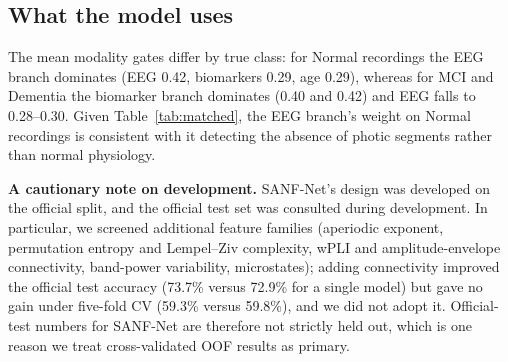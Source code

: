 \documentclass[conference]{IEEEtran}
\begin{document}
\begin{table}[t]
\centering
\caption{Age-matched AUC versus MCI (1:1, caliper 2 years) on out-of-fold predictions, with 95\%
bootstrap CI over matched pairs.}
\label{tab:matched}
\end{table}

\subsection{What the model uses}
The mean modality gates differ by true class: for Normal recordings the EEG branch dominates (EEG 0.42,
biomarkers 0.29, age 0.29), whereas for MCI and Dementia the biomarker branch dominates (0.40 and 0.42)
and EEG falls to 0.28--0.30. Given Table~\ref{tab:matched}, the EEG branch's weight on Normal
recordings is consistent with it detecting the absence of photic segments rather than normal
physiology.

\textbf{A cautionary note on development.} SANF-Net's design was developed on the official split, and
the official test set was consulted during development. In particular, we screened additional feature
families (aperiodic exponent, permutation entropy and Lempel--Ziv complexity, wPLI and
amplitude-envelope connectivity, band-power variability, microstates); adding connectivity improved
the official test accuracy (73.7\% versus 72.9\% for a single model) but gave no gain under five-fold
CV (59.3\% versus 59.8\%), and we did not adopt it. Official-test numbers for SANF-Net are therefore
not strictly held out, which is one reason we treat cross-validated OOF results as primary.
\end{document}
